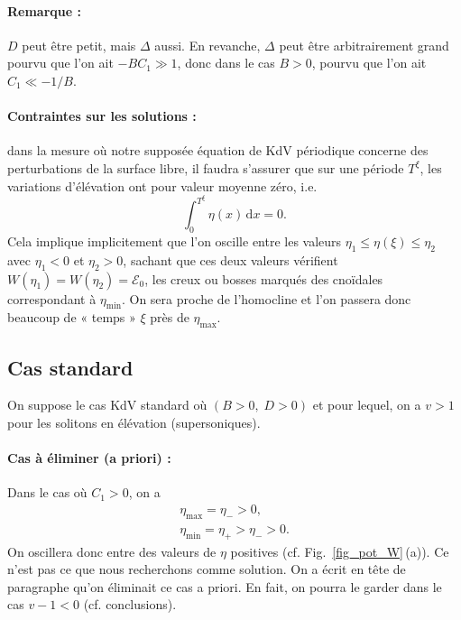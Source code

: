 \documentclass[10pt,a4paper, oneside, fleqn]{myarticle}
\newcommand{\idd}{\,\mathrm{d}}
\newcommand{\Ecal}{\mathcal{E}}
\begin{document}
\paragraph{Remarque :} $D$ peut être petit, mais $\Delta$ aussi. En revanche, $\Delta$ peut être arbitrairement grand pourvu que l'on ait $-BC_1 \gg 1$, donc dans le cas $B>0$, pourvu que l'on ait $C_1 \ll -1/B$.

\paragraph{Contraintes sur les solutions :} dans la mesure où notre supposée équation de KdV périodique concerne des perturbations de la surface libre, il faudra s'assurer que sur une période $T^\xi$, les variations d'élévation ont pour valeur moyenne zéro, i.e.
\begin{equation}
  \int_0^{T^\xi}\eta(x) \idd x = 0.\label{zero_mean_value}
\end{equation}
Cela implique implicitement que l'on oscille entre les valeurs $\eta_1\leq\eta(\xi)\leq \eta_2$ avec $\eta_1<0$ et $\eta_2>0$, sachant que ces deux valeurs vérifient $W(\eta_1)=W(\eta_2)=\Ecal_0$, les creux ou bosses marqués des cnoïdales correspondant à $\eta_{\min}$. On sera proche de l'homocline et l'on passera donc beaucoup de « temps » $\xi$ près de $\eta_{\max}$.


\subsection{Cas standard }

On suppose le cas KdV standard où  $(B>0, \; D>0)$ et pour lequel, on a $v > 1$ pour les solitons en élévation (supersoniques).

\medskip

\paragraph{Cas à éliminer (a priori) : } Dans le cas où $C_1 >0$, on a
\begin{gather}
  \eta_{\max} = \eta_- >0,\\
  \eta_{\min} = \eta_+ > \eta_- >0.
\end{gather}
On oscillera donc entre des valeurs de $\eta$ positives (cf. Fig.~\ref{fig_pot_W}\,(a)). Ce n'est pas ce que nous recherchons comme solution. On a écrit en tête de paragraphe qu'on éliminait ce cas a priori. En fait, on pourra le garder dans le cas $v-1<0$ (cf. conclusions).
\end{document}
